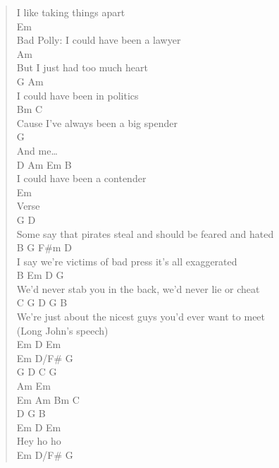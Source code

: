 \documentclass[11pt]{article}
\begin{document}
\begin{verse}
I like taking things apart\\
Em\\
Bad Polly: I could have been a lawyer\\
Am\\
But I just had too much heart\\
G                    Am\\
I could have been in politics\\
Bm                           C\\
Cause I've always been a big spender\\
G\\
And me\ldots{}\\
D                     Am       Em  B\\
I could have been a contender\\
\vspace*{1em}
Em\\
\vspace*{1em}
Verse\\
G                                         D\\
Some say that pirates steal and should be feared and hated\\
B                    G               F\#m          D\\
I say we're victims of bad press it's all exaggerated\\
B                         Em           D            G\\
We'd never stab you in the back, we'd never lie or cheat\\
C                     G                D              G       B\\
We're just about the nicest guys you'd ever want to meet\\
\vspace*{1em}
\vspace*{1em}
(Long John's speech)\\
Em D Em\\
Em D/F\# G\\
G  D  C  G\\
Am      Em\\
Em  Am  Bm  C\\
D  G   B\\
\vspace*{1em}
\vspace*{1em}
Em D Em\\
Hey ho ho\\
\hspace*{5em}Em   D/F\#    G\\

\end{verse}
\end{document}
